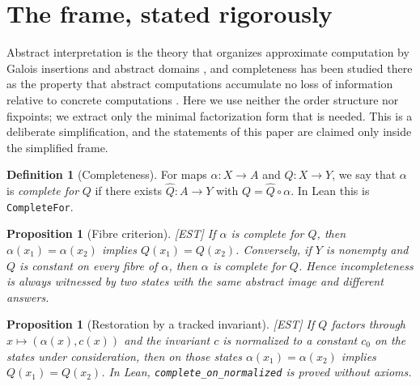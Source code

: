 \documentclass[11pt]{article}
\theoremstyle{plain}
\newtheorem{proposition}[theorem]{Proposition}
\theoremstyle{definition}
\newtheorem{definition}[theorem]{Definition}
\theoremstyle{remark}
\newcommand{\EST}{\textup{[EST]}}
\begin{document}
\section{The frame, stated rigorously}

Abstract interpretation is the theory that organizes approximate
computation by Galois insertions and abstract domains
\cite{CC77,CC79}, and completeness has been studied there as the
property that abstract computations accumulate no loss of
information relative to concrete computations \cite{GR97,GRS00}.
Here we use neither the order structure nor fixpoints; we extract
only the minimal factorization form that is needed.  This is a
deliberate simplification, and the statements of this paper are
claimed only inside the simplified frame.

\begin{definition}[Completeness]\label{def:complete}
For maps $\alpha:X\to A$ and $Q:X\to Y$, we say that $\alpha$ is
\emph{complete for} $Q$ if there exists $\widehat Q:A\to Y$ with
$Q=\widehat Q\circ\alpha$.  In Lean this is \texttt{CompleteFor}.
\end{definition}

\begin{proposition}[Fibre criterion]\label{prop:fibre}\EST{}
If $\alpha$ is complete for $Q$, then $\alpha(x_1)=\alpha(x_2)$
implies $Q(x_1)=Q(x_2)$.  Conversely, if $Y$ is nonempty and $Q$ is
constant on every fibre of $\alpha$, then $\alpha$ is complete for
$Q$.  Hence incompleteness is always witnessed by two states with
the same abstract image and different answers.
\end{proposition}

\begin{proposition}[Restoration by a tracked invariant]\EST{}
If $Q$ factors through $x\mapsto(\alpha(x),c(x))$ and the invariant
$c$ is normalized to a constant $c_0$ on the states under
consideration, then on those states $\alpha(x_1)=\alpha(x_2)$ implies
$Q(x_1)=Q(x_2)$.  In Lean, \texttt{complete\_on\_normalized} is
proved without axioms.
\end{proposition}
\end{document}
